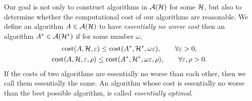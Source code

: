\documentclass[final]{elsarticle}
\theoremstyle{definition}
\theoremstyle{remark}
\begin{document}
Our goal is not only to construct algorithms in $\mathcal{A}(\mathcal{H})$ for some $\mathcal{H}$, but also to determine whether the computational cost of our algorithms are reasonable.  We define an algorithm $A \in \mathcal{A}(\mathcal{H})$ to have \emph{essentially no worse cost} then an algorithm $A^* \in \mathcal{A}(\mathcal{H}^*)$ if for some number $\omega$,
\begin{gather}
\operatorname{cost}(A,\mathcal{H},\varepsilon) \le \operatorname{cost}(A^*,\mathcal{H}^*,\omega\varepsilon), \qquad \forall \varepsilon > 0, \\
\operatorname{cost}(A,\mathcal{H},\varepsilon,\rho) \le \operatorname{cost}(A^*,\mathcal{H}^*,\omega\varepsilon,\rho), \qquad \forall \varepsilon,\rho > 0.
\end{gather}
If the costs of two algorithms are essentially no worse than each other, then we call them essentially the same.  An algorithm whose cost is essentially no worse than the best possible algorithm, is called \emph{essentially optimal}.
\end{document}
